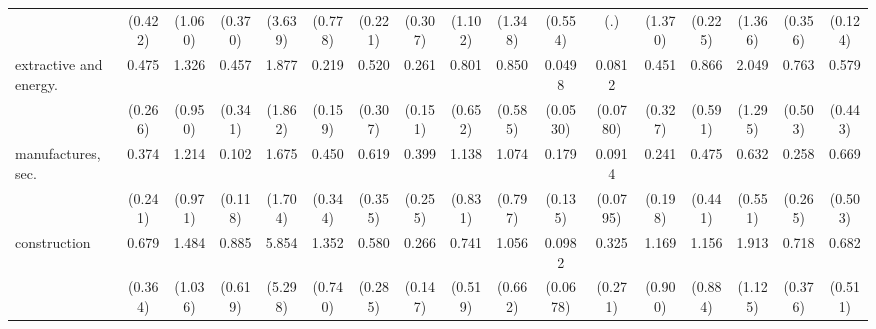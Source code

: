 {\begin{tabular}{l*{16}{c}}
                    &     (0.422)         &     (1.060)         &     (0.370)         &     (3.639)         &     (0.778)         &     (0.221)         &     (0.307)         &     (1.102)         &     (1.348)         &     (0.554)         &         (.)         &     (1.370)         &     (0.225)         &     (1.366)         &     (0.356)         &     (0.124)         \\
[1em]
extractive and energy.&       0.475         &       1.326         &       0.457         &       1.877         &       0.219\sym{*}  &       0.520         &       0.261\sym{*}  &       0.801         &       0.850         &      0.0498\sym{**} &      0.0812\sym{**} &       0.451         &       0.866         &       2.049         &       0.763         &       0.579         \\
                    &     (0.266)         &     (0.950)         &     (0.341)         &     (1.862)         &     (0.159)         &     (0.307)         &     (0.151)         &     (0.652)         &     (0.585)         &    (0.0530)         &    (0.0780)         &     (0.327)         &     (0.591)         &     (1.295)         &     (0.503)         &     (0.443)         \\
[1em]
manufactures, sec.  &       0.374         &       1.214         &       0.102\sym{*}  &       1.675         &       0.450         &       0.619         &       0.399         &       1.138         &       1.074         &       0.179\sym{*}  &      0.0914\sym{**} &       0.241         &       0.475         &       0.632         &       0.258         &       0.669         \\
                    &     (0.241)         &     (0.971)         &     (0.118)         &     (1.704)         &     (0.344)         &     (0.355)         &     (0.255)         &     (0.831)         &     (0.797)         &     (0.135)         &    (0.0795)         &     (0.198)         &     (0.441)         &     (0.551)         &     (0.265)         &     (0.503)         \\
[1em]
construction        &       0.679         &       1.484         &       0.885         &       5.854         &       1.352         &       0.580         &       0.266\sym{*}  &       0.741         &       1.056         &      0.0982\sym{***}&       0.325         &       1.169         &       1.156         &       1.913         &       0.718         &       0.682         \\
                    &     (0.364)         &     (1.036)         &     (0.619)         &     (5.298)         &     (0.740)         &     (0.285)         &     (0.147)         &     (0.519)         &     (0.662)         &    (0.0678)         &     (0.271)         &     (0.900)         &     (0.884)         &     (1.125)         &     (0.376)         &     (0.511)         \\

\end{tabular}}

